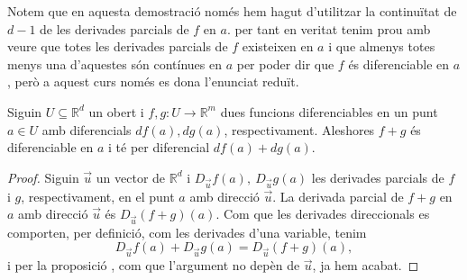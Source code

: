 \documentclass[../Apunts.tex]{subfiles}
\begin{document}
	\begin{note}
		Notem que en aquesta demostració només hem hagut d'utilitzar la continuïtat de \(d-1\) de les derivades parcials de \(f\) en \(a\). per tant en veritat tenim prou amb veure que totes les derivades parcials de \(f\) existeixen en \(a\) i que almenys totes menys una d'aquestes són contínues en \(a\) per poder dir que \(f\) és diferenciable en \(a\), però a aquest curs només es dona l'enunciat reduït.
	\end{note}
	\begin{proposition}
		Siguin \(U\subseteq\mathbb{R}^{d}\) un obert i \(f,g\colon U\to\mathbb{R}^{m}\) dues funcions diferenciables en un punt \(a\in U\) amb diferencials \(df(a),dg(a)\), respectivament. Aleshores \(f+g\) és diferenciable en \(a\) i té per diferencial \(df(a)+dg(a)\).
		\begin{proof}
			Siguin \(\vec{u}\) un vector de \(\mathbb{R}^{d}\) i \(D_{\vec{u}}f(a),\ D_{\vec{u}}g(a)\) les derivades parcials de \(f\) i \(g\), respectivament, en el punt \(a\) amb direcció \(\vec{u}\). La derivada parcial de \(f+g\) en \(a\) amb direcció \(\vec{u}\) és \(D_{\vec{u}}(f+g)(a)\). Com que les derivades direccionals es comporten, per definició, com les derivades d'una variable, tenim
			\[D_{\vec{u}}f(a)+D_{\vec{u}}g(a)=D_{\vec{u}}(f+g)(a),\]
			i per la proposició , com que l'argument no depèn de \(\vec{u}\), ja hem acabat.
		\end{proof}
	\end{proposition}
\end{document}
